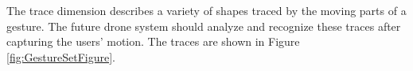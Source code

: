 \documentclass{sigchi}
\begin{document}
The trace dimension describes a variety of shapes traced by the moving parts of a gesture. The future drone system should analyze and recognize these traces after capturing the users' motion. The traces are shown in Figure \ref{fig:GestureSetFigure}.



\end{document}
